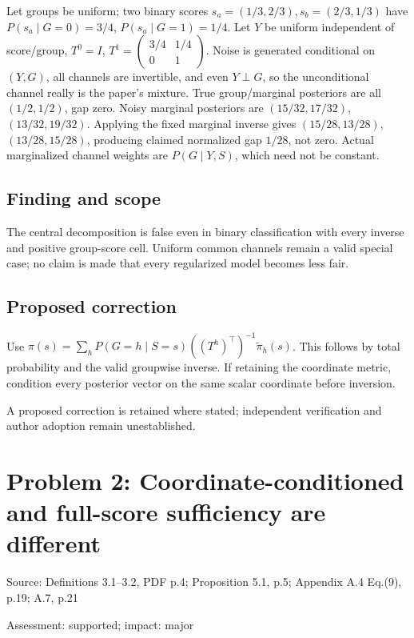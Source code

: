 \documentclass[11pt]{article}
\begin{document}
Let groups be uniform; two binary scores \(s_a=(1/3,2/3),s_b=(2/3,1/3)\) have \(P(s_a\mid G=0)=3/4\), \(P(s_a\mid G=1)=1/4\). Let \(Y\) be uniform independent of score/group, \(T^0=I\), \(T^1=\begin{pmatrix}3/4&1/4\\0&1\end{pmatrix}\). Noise is generated conditional on \((Y,G)\), all channels are invertible, and even \(Y\perp G\), so the unconditional channel really is the paper’s mixture. True group/marginal posteriors are all \((1/2,1/2)\), gap zero. Noisy marginal posteriors are \((15/32,17/32)\), \((13/32,19/32)\). Applying the fixed marginal inverse gives \((15/28,13/28)\), \((13/28,15/28)\), producing claimed normalized gap \(1/28\), not zero. Actual marginalized channel weights are \(P(G\mid Y,S)\), which need not be constant.

\subsection*{Finding and scope}

The central decomposition is false even in binary classification with every inverse and positive group-score cell. Uniform common channels remain a valid special case; no claim is made that every regularized model becomes less fair.

\subsection*{Proposed correction}

Use \(\pi(s)=\sum_hP(G=h\mid S=s)((T^h)^\top)^{-1}\widetilde\pi_h(s)\). This follows by total probability and the valid groupwise inverse. If retaining the coordinate metric, condition every posterior vector on the same scalar coordinate before inversion.

A proposed correction is retained where stated; independent verification and author adoption remain unestablished.

\section*{Problem 2: Coordinate-conditioned and full-score sufficiency are different}

Source: Definitions 3.1–3.2, PDF p.4; Proposition 5.1, p.5; Appendix A.4 Eq.(9), p.19; A.7, p.21

Assessment: supported; impact: major
\end{document}
